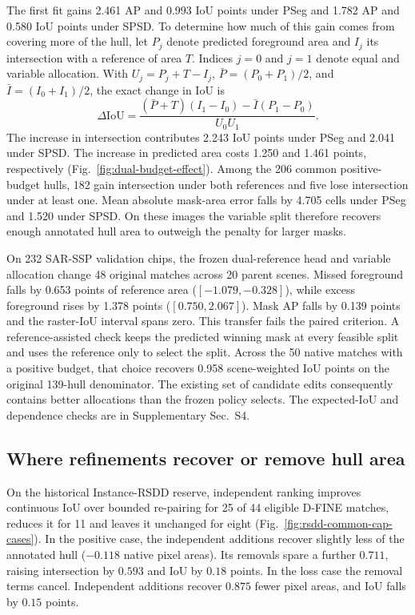 \documentclass[journal]{IEEEtran}
\begin{document}
The first fit gains 2.461 AP and 0.993 IoU points under PSeg and 1.782 AP and 0.580 IoU points under SPSD. To determine how much of this gain comes from covering more of the hull, let \(P_j\) denote predicted foreground area and \(I_j\) its intersection with a reference of area \(T\). Indices \(j=0\) and \(j=1\) denote equal and variable allocation. With \(U_j=P_j+T-I_j\), \(\bar P=(P_0+P_1)/2\), and \(\bar I=(I_0+I_1)/2\), the exact change in IoU is
\begin{equation}
\Delta\mathrm{IoU} =
 \frac{(\bar P+T)(I_1-I_0)-\bar I(P_1-P_0)}{U_0U_1}.
\label{eq:area-overlap-parts}
\end{equation}
The increase in intersection contributes 2.243 IoU points under PSeg and 2.041 under SPSD. The increase in predicted area costs 1.250 and 1.461 points, respectively (Fig.~\ref{fig:dual-budget-effect}). Among the 206 common positive-budget hulls, 182 gain intersection under both references and five lose intersection under at least one. Mean absolute mask-area error falls by 4.705 cells under PSeg and 1.520 under SPSD. On these images the variable split therefore recovers enough annotated hull area to outweigh the penalty for larger masks.

On 232 SAR-SSP validation chips, the frozen dual-reference head and variable allocation change 48 original matches across 20 parent scenes. Missed foreground falls by 0.653 points of reference area (\([-1.079,-0.328]\)), while excess foreground rises by 1.378 points (\([0.750,2.067]\)). Mask AP falls by 0.139 points and the raster-IoU interval spans zero. This transfer fails the paired criterion. A reference-assisted check keeps the predicted winning mask at every feasible split and uses the reference only to select the split. Across the 50 native matches with a positive budget, that choice recovers 0.958 scene-weighted IoU points on the original 139-hull denominator. The existing set of candidate edits consequently contains better allocations than the frozen policy selects. The expected-IoU and dependence checks are in Supplementary Sec.~S4.

\subsection{Where refinements recover or remove hull area}
\label{sec:qualitative}
On the historical Instance-RSDD reserve, independent ranking improves continuous IoU over bounded re-pairing for 25 of 44 eligible D-FINE matches, reduces it for 11 and leaves it unchanged for eight (Fig.~\ref{fig:rsdd-common-cap-cases}). In the positive case, the independent additions recover slightly less of the annotated hull ($-0.118$ native pixel areas). Its removals spare a further $0.711$, raising intersection by $0.593$ and IoU by $0.18$ points. In the loss case the removal terms cancel. Independent additions recover $0.875$ fewer pixel areas, and IoU falls by $0.15$ points.
\end{document}
